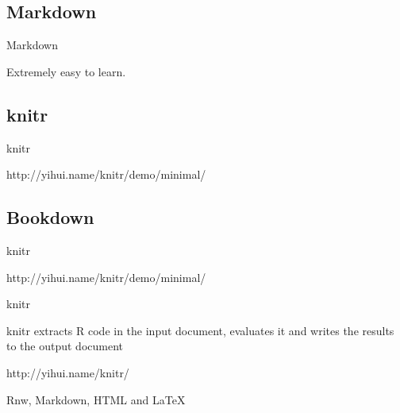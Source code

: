 \documentclass{beamer}
\begin{document}

\subsection[Markdown]{Markdown}

\begin{frame}{Markdown} %

Extremely easy to learn.
\end{frame}



\subsection[Markdown]{knitr}

\begin{frame}{knitr} %

http://yihui.name/knitr/demo/minimal/

\end{frame}



\subsection[Markdown]{Bookdown}

\begin{frame}{knitr} %

http://yihui.name/knitr/demo/minimal/

\end{frame}





\begin{frame}{knitr} %

knitr extracts R code in the input document, evaluates it and writes the results to the output document

http://yihui.name/knitr/

Rnw, Markdown, HTML and LaTeX

\end{frame}

\end{document}
